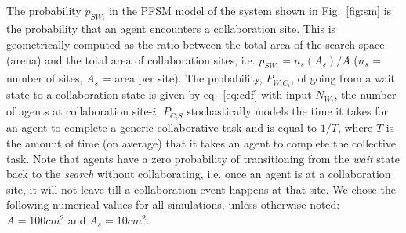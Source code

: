 \documentclass{TeXstyles/DARS/svmult}  %
\begin{document}
The probability $p_{SW_i}$ in the PFSM model of the system shown in Fig.~\ref{fig:sm} is the probability that an agent encounters a collaboration site. This is geometrically computed as the ratio between the total area of the search space (arena) and the total area of collaboration sites, i.e. $p_{SW_i} = n_s(A_s)/A$ ($n_s$ = number of sites, $A_s$ = area per site). The probability, $P_{W_iC_i}$, of going from a wait state to a collaboration state is given by eq.~\eqref{eq:cdf} with input $N_{W_i}$, the number of agents at collaboration site-$i$. $P_{C_iS}$ stochastically models the time it takes for an agent to complete a generic collaborative task and is equal to $1/T$, where $T$ is the amount of time (on average) that it takes an agent to complete the collective task. Note that agents have a zero probability of transitioning from the \emph{wait} state back to the \emph{search} without collaborating, i.e. once an agent is at a collaboration site, it will not leave till a collaboration event happens at that site. We chose the following numerical values for all simulations, unless otherwise noted: $A=100cm^2$ and $A_s=10cm^2$.
\end{document}
